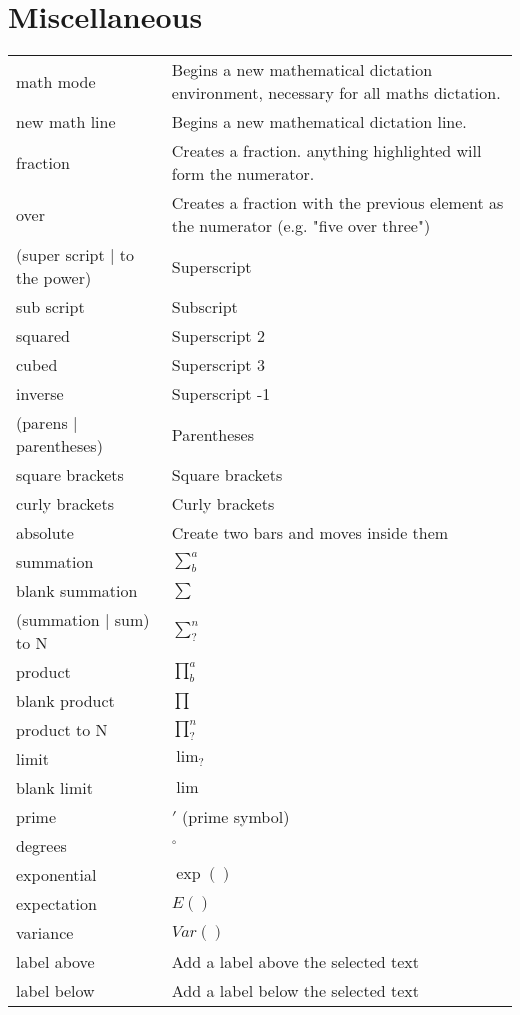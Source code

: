 \documentclass[12pt]{article}
\begin{document}
\section{Miscellaneous}
\begin{tabularx}{\linewidth}{ l X}
math mode & Begins a new mathematical dictation environment, necessary for all maths dictation. \\
new math line & Begins a new mathematical dictation line. \\
fraction & Creates a fraction. anything highlighted will form the numerator. \\
over & Creates a fraction with the previous element as the numerator (e.g. "five over three") \\
(super script | to the power) & Superscript \\
sub script & Subscript \\
squared & Superscript 2 \\
cubed & Superscript 3 \\
inverse & Superscript -1 \\
(parens | parentheses) & Parentheses \\
square brackets & Square brackets \\
curly brackets & Curly brackets \\
absolute & Create two bars and moves inside them \\
summation & $\sum^{a}_{b}$ \\
blank summation & $\sum$ \\
(summation | sum) to N & $\sum^{n}_{?}$ \\
product & $\prod^{a}_{b}$ \\
blank product & $\prod$ \\
product to N & $\prod^{n}_{?}$ \\
limit & $\lim_{?}$ \\
blank limit & $\lim$ \\
prime & $\prime$ (prime symbol) \\
degrees & $^{\circ}$ \\
exponential & $\exp ()$ \\
expectation & $E()$ \\
variance & $Var()$ \\
label above & Add a label above the selected text \\
label below & Add a label below the selected text \\
\end{tabularx}
\end{document}
